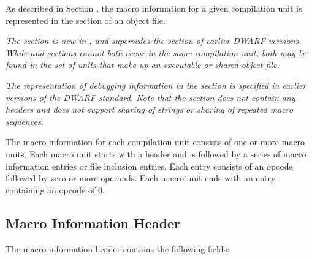 As described in 
Section ,
the macro information for a
given compilation unit is represented in the 
\dotdebugmacro{}
section of an object file. 

\textit{The \dotdebugmacro{} section is new in 
\DWARFVersionV, and supersedes the
\dotdebugmacinfo{} section of earlier DWARF versions. 
While \dotdebugmacro{} and \dotdebugmacinfo{}
sections cannot both occur in the same compilation unit, both may be found in the 
set of units that make up an executable or shared object file.}

\textit{The representation of debugging information in the \dotdebugmacinfo{} section is specified
in earlier versions of the DWARF standard. Note that the \dotdebugmacinfo{} section does not contain 
any headers and does not support sharing of strings or sharing of repeated macro sequences.}

The macro information for each compilation unit consists of one or
more macro units.  Each macro unit starts with a header
and is followed by a series of macro information entries or file
inclusion entries.  Each entry consists of an opcode followed by
zero or more operands. Each macro unit ends with an entry
containing an opcode of 0.

\subsection{Macro Information Header}
The macro information header contains the following fields:

